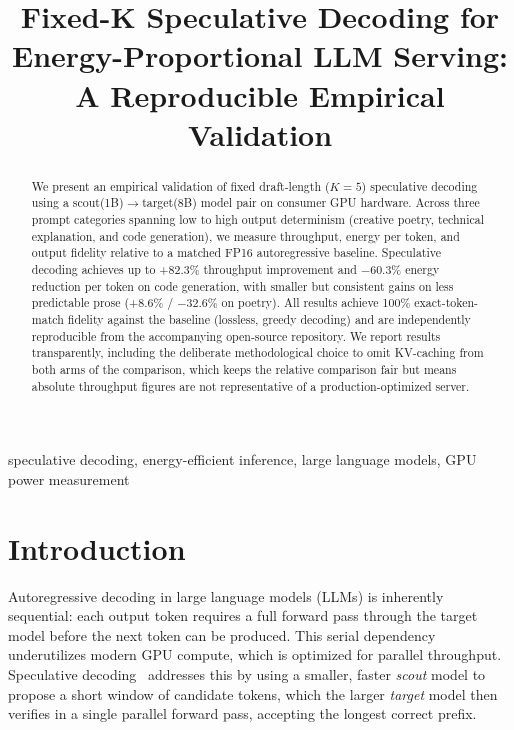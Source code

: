 \documentclass[conference]{IEEEtran}
\begin{document}
\title{Fixed-K Speculative Decoding for Energy-Proportional LLM Serving: \\
A Reproducible Empirical Validation}

\author{
}

\maketitle

\begin{abstract}
We present an empirical validation of fixed draft-length ($K{=}5$) speculative
decoding using a scout(1B)$\to$target(8B) model pair on consumer GPU hardware.
Across three prompt categories spanning low to high output determinism (creative
poetry, technical explanation, and code generation), we measure throughput,
energy per token, and output fidelity relative to a matched FP16 autoregressive
baseline. Speculative decoding achieves up to +82.3\% throughput
improvement and $-$60.3\% energy reduction per token on
code generation, with smaller but consistent gains on less predictable prose
(+8.6\% / $-$32.6\% on poetry). All results
achieve 100\% exact-token-match fidelity against the baseline (lossless,
greedy decoding) and are independently reproducible from the accompanying
open-source repository. We report results transparently, including the
deliberate methodological choice to omit KV-caching from both arms of the
comparison, which keeps the relative comparison fair but means absolute
throughput figures are not representative of a production-optimized server.
\end{abstract}

\begin{IEEEkeywords}
speculative decoding, energy-efficient inference, large language models, GPU power measurement
\end{IEEEkeywords}

\section{Introduction}

Autoregressive decoding in large language models (LLMs) is inherently
sequential: each output token requires a full forward pass through the
target model before the next token can be produced. This serial dependency
underutilizes modern GPU compute, which is optimized for parallel throughput.
Speculative decoding~\cite{leviathan2023fast,chen2023accelerating} addresses
this by using a smaller, faster \emph{scout} model to propose a short window
of candidate tokens, which the larger \emph{target} model then verifies in a
single parallel forward pass, accepting the longest correct prefix.
\end{document}
